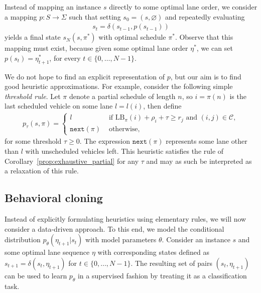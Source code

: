 \documentclass[a4paper]{article}
\theoremstyle{definition}
\theoremstyle{plain}
\begin{document}
Instead of mapping an instance $s$ directly to some optimal lane order, we
consider a mapping $p : S \rightarrow \Sigma$ such that setting
$s_{0} = (s, \varnothing)$ and repeatedly evaluating
\begin{align*}
  s_{t} = \delta(s_{t-1}, p(s_{t-1}))
\end{align*}
yields a final state $s_{N}(s, \pi^{*})$ with optimal schedule $\pi^{*}$.
Observe that this mapping must exist, because given some optimal lane order
$\eta^{*}$, we can set $p(s_{t}) = \eta^{*}_{t+1}$, for every $t \in \{0, \dots, N-1\}$.

We do not hope to find an explicit representation of $p$, but our aim is to find
good heuristic approximations.
For example, consider the following simple \textit{threshold rule}.
%
Let $\pi$ denote a partial schedule of length $n$, so $i=\pi(n)$ is the last
scheduled vehicle on some lane $l=l(i)$, then define
\begin{align*}
  p_{\tau}(s, \pi) = \begin{cases}
                l \quad &\text{ if } \text{LB}_{\pi}(i) + \rho_{i} + \tau \geq r_{j} \text{ and } (i,j) \in \mathcal{C} , \\
                \texttt{next}(\pi) & \text{ otherwise, }
              \end{cases}
\end{align*}
for some threshold $\tau \geq 0$. The expression $\texttt{next}(\pi)$ represents some lane
other than $l$ with unscheduled vehicles left.
%
This heuristic satisfies the rule of
Corollary~\ref{prop:exhaustive_partial} for any $\tau$ and may as such be
interpreted as a relaxation of this rule.


\subsection*{Behavioral cloning}


Instead of explicitly formulating heuristics using elementary rules, we will now
consider a data-driven approach. To this end, we model the conditional
distribution $p_{\theta}(\eta_{t+1} | s_{t})$ with model parameters $\theta$.
%
Consider an instance $s$ and some optimal lane sequence $\eta$ with
corresponding states defined as $s_{t+1} = \delta(s_{t}, \eta_{t+1})$ for
$t \in \{0, \dots, N-1\}$. The resulting set of pairs $(s_{t}, \eta_{t+1})$ can be
used to learn $p_{\theta}$ in a supervised fashion by treating it as a classification
task.
\end{document}

